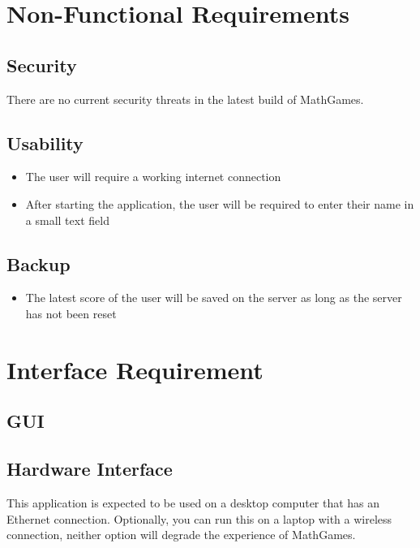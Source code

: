 \documentclass[12pt]{article}
\begin{document}
\newpage

\section{Non-Functional Requirements}

\subsection{Security}

There are no current security threats in the latest build of MathGames.

\subsection{Usability}

\begin{itemize}
\item The user will require a working internet connection
\item After starting the application, the user will be required to enter their name in a small text field
\end{itemize}

\subsection{Backup}

\begin{itemize}
\item The latest score of the user will be saved on the server as long as the server has not been reset
\end{itemize}

\section{Interface Requirement}

\subsection{GUI}

\subsection{Hardware Interface}

This application is expected to be used on a desktop computer that has an Ethernet connection.
Optionally, you can run this on a laptop with a wireless connection, neither option will degrade the experience of MathGames.
\end{document}
